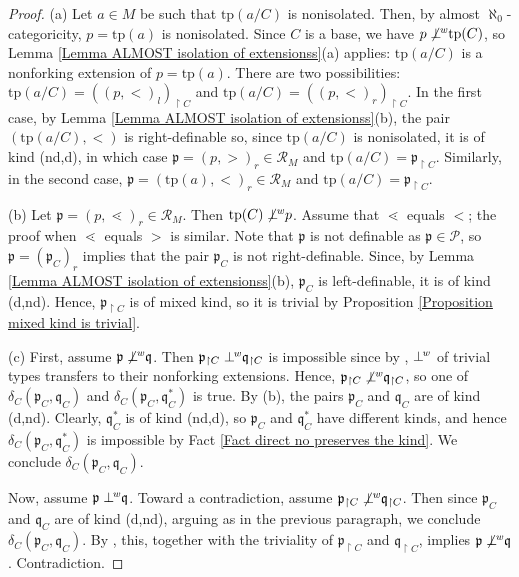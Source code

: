 \documentclass{amsart}
\theoremstyle{definition}
\theoremstyle{definition}
\def\strok{\restriction}
\newcommand{\wor}{\perp\hspace*{-0.4em}^{\mathit w}}
\newcommand{\nwor}{\not\perp\hspace*{-0.4em}^{\mathit w}}
\newcommand{\tp}{\mathrm{tp}}
\begin{document}
\begin{proof}
(a) Let $a\in M$ be such that $\tp(a/C)$ is nonisolated. Then, by almost $\aleph_0$-categoricity, $p=\tp(a)$ is nonisolated. Since $C$ is a base, we have $p\nwor \tp(C)$, so Lemma \ref{Lemma ALMOST isolation of extensionss}(a) applies: $\tp(a/C)$ is a nonforking extension of $p=\tp(a)$. There are two possibilities: $\tp(a/C)=((p,<)_{l})_{\strok C}$ and $\tp(a/C)=((p,<)_r)_{\strok C}$. In the first case, by Lemma \ref{Lemma ALMOST isolation of extensionss}(b), the pair $(\tp(a/C),<)$ is right-definable so, since $\tp(a/C)$ is nonisolated, it is of kind (nd,d), in which case $\mathfrak p=(p,>)_r\in\mathcal R_M$ and $\tp(a/C)=\mathfrak p_{\strok C}$. Similarly, in the second case, $\mathfrak p=(\tp(a),<)_r\in\mathcal R_M$ and $\tp(a/C)=\mathfrak p_{\strok C}$.

(b) Let $\mathfrak p=(p,\lessdot)_r\in\mathcal R_M$. Then $\tp(C)\nwor p$. Assume that $\lessdot$ equals $<$; the proof when $\lessdot$ equals $>$ is similar. Note that $\mathfrak p$ is not definable as $\mathfrak p\in \mathcal P$, so $\mathfrak p=(\mathfrak p_C)_r$ implies that the pair $\mathfrak p_C$ is not right-definable. 
Since, by Lemma \ref{Lemma ALMOST isolation of extensionss}(b), $\mathfrak p_C$ is left-definable, it is of kind (d,nd).
Hence, $\mathfrak p_{\strok C}$ is of mixed kind, so it is trivial by Proposition \ref{Proposition mixed kind is trivial}. 

(c) First, assume $\mathfrak p\nwor \mathfrak q$. Then $\mathfrak p_{\strok C}\wor\mathfrak q_{\strok C}$ is impossible since by \cite[Theorem 5.10(c)]{MTwqom1}, $\wor$ of trivial types transfers to their nonforking extensions. Hence, $\mathfrak p_{\strok C}\nwor \mathfrak q_{\strok C}$, so one of $\delta_C(\mathfrak p_C,\mathfrak q_C)$ and $\delta_C(\mathfrak p_C,\mathfrak q_C^*)$ is true. By (b), the pairs $\mathfrak p_C$ and $\mathfrak q_C$ are of kind (d,nd). Clearly, $\mathfrak q^*_C$ is of kind (nd,d), so $\mathfrak p_C$ and $\mathfrak q_C^*$ have different kinds, and hence $\delta_C(\mathfrak p_C,\mathfrak q_C^*)$ is impossible by Fact \ref{Fact direct no preserves the kind}. We conclude $\delta_C(\mathfrak p_C,\mathfrak q_C)$.

Now, assume $\mathfrak p\wor \mathfrak q$. Toward a contradiction, assume $\mathfrak p_{\strok C}\nwor \mathfrak q_{\strok C}$. Then since $\mathfrak p_C$ and $\mathfrak q_C$ are of kind (d,nd), arguing as in the previous paragraph, we conclude $\delta_C(\mathfrak p_C,\mathfrak q_C)$. By \cite[Corollary 5.11(a)]{MTwqom1}, this, together with the triviality of $\mathfrak p_{\strok C}$ and $\mathfrak q_{\strok C}$, implies $\mathfrak p\nwor \mathfrak q$. Contradiction. 


\end{proof}
\end{document}
